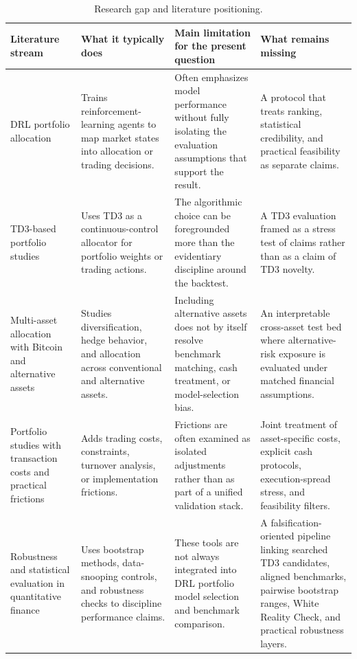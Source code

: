 \documentclass[11pt]{article}
\renewcommand{\arraystretch}{1.18}
\begin{document}
\begin{table}[H]
\centering
\caption{Research gap and literature positioning.}
\label{tab:research-gap}
\footnotesize
\setlength{\tabcolsep}{4.5pt}
\renewcommand{\arraystretch}{1.32}
\begin{adjustbox}{max width=\textwidth}
\begin{tabularx}{\textwidth}{@{}L{0.17\textwidth} L{0.25\textwidth} L{0.27\textwidth} Y@{}}
\toprule
Literature stream & What it typically does & Main limitation for the present question & What remains missing \\
\midrule
DRL portfolio allocation & Trains reinforcement-learning agents to map market states into allocation or trading decisions. & Often emphasizes model performance without fully isolating the evaluation assumptions that support the result. & A protocol that treats ranking, statistical credibility, and practical feasibility as separate claims. \\
TD3-based portfolio studies & Uses TD3 as a continuous-control allocator for portfolio weights or trading actions. & The algorithmic choice can be foregrounded more than the evidentiary discipline around the backtest. & A TD3 evaluation framed as a stress test of claims rather than as a claim of TD3 novelty. \\
Multi-asset allocation with Bitcoin and alternative assets & Studies diversification, hedge behavior, and allocation across conventional and alternative assets. & Including alternative assets does not by itself resolve benchmark matching, cash treatment, or model-selection bias. & An interpretable cross-asset test bed where alternative-risk exposure is evaluated under matched financial assumptions. \\
Portfolio studies with transaction costs and practical frictions & Adds trading costs, constraints, turnover analysis, or implementation frictions. & Frictions are often examined as isolated adjustments rather than as part of a unified validation stack. & Joint treatment of asset-specific costs, explicit cash protocols, execution-spread stress, and feasibility filters. \\
Robustness and statistical evaluation in quantitative finance & Uses bootstrap methods, data-snooping controls, and robustness checks to discipline performance claims. & These tools are not always integrated into DRL portfolio model selection and benchmark comparison. & A falsification-oriented pipeline linking searched TD3 candidates, aligned benchmarks, pairwise bootstrap ranges, White Reality Check, and practical robustness layers. \\
\bottomrule
\end{tabularx}
\end{adjustbox}
\end{table}
\end{document}
